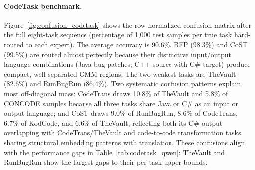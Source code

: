 \paragraph{CodeTask benchmark.} Figure~\ref{fig:confusion_codetask} shows the row-normalized confusion matrix after the full eight-task sequence (percentage of 1{,}000 test samples per true task hard-routed to each expert). The average accuracy is 90.6\%. BFP (98.3\%) and CoST (99.5\%) are routed almost perfectly because their distinctive input/output language combinations (Java bug patches; C++ source with C\# target) produce compact, well-separated GMM regions. The two weakest tasks are TheVault (82.6\%) and RunBugRun (86.4\%). Two systematic confusion patterns explain most off-diagonal mass: CodeTrans draws 10.8\% of TheVault and 5.8\% of CONCODE samples because all three tasks share Java or C\# as an input or output language; and CoST draws 9.0\% of RunBugRun, 8.6\% of CodeTrans, 6.7\% of KodCode, and 6.6\% of TheVault, reflecting both its C\# output overlapping with CodeTrans/TheVault and code-to-code transformation tasks sharing structural embedding patterns with translation. These confusions align with the performance gaps in Table~\ref{tab:codetask_qwen}: TheVault and RunBugRun show the largest gaps to their per-task upper bounds.


